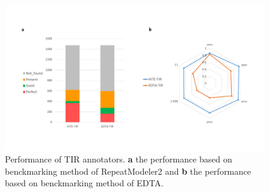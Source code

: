 \documentclass{bmcart}
\begin{document}
\begin{figure}[h!]
	\centerline{\includegraphics[width=1.0\textwidth]{figures/TIRResults.pdf}}
	\caption{Performance of TIR annotators. \textbf{a} the performance based on benckmarking method of RepeatModeler2 and \textbf{b} the performance based on benckmarking method of EDTA.}
	\label{fig:tir_results}
\end{figure}
\end{document}
